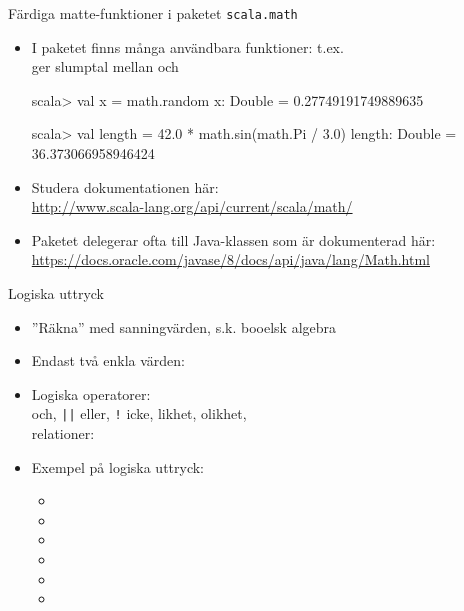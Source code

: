 \documentclass{simpleslides}
\begin{document}
    
    \begin{Slide}{Färdiga matte-funktioner i paketet \texttt{scala.math}}\SlideFontSmall
    \begin{itemize}
    \item I paketet \texttt{} finns många användbara funktioner: t.ex.\\
     ger slumptal mellan  och 
    \begin{REPLnonum}
    scala> val x = math.random
    x: Double = 0.27749191749889635
    
    scala> val length = 42.0 * math.sin(math.Pi / 3.0)
    length: Double = 36.373066958946424
    \end{REPLnonum}
    
    \item Studera dokumentationen här: \\{\SlideFontTiny
    \url{http://www.scala-lang.org/api/current/scala/math/}}
    
    \item Paketet  delegerar ofta till Java-klassen \texttt{} som är dokumenterad här: \\{\SlideFontTiny
    \url{https://docs.oracle.com/javase/8/docs/api/java/lang/Math.html}}
    
    \end{itemize}
    \end{Slide}
    
    
    
     
\begin{Slide}{Logiska uttryck}
\begin{itemize}
\item ''Räkna'' med sanningvärden,
s.k. booelsk algebra %

\item Endast två enkla värden: 
\item Logiska operatorer:\\
\code{&&} och, \texttt{||} eller, \texttt{!} icke, \code{==} likhet, \code{!=} olikhet, \\
relationer: \code{> < >= <=}

\item Exempel på logiska uttryck:
\begin{itemize}
\item[] 
\item[] 
\item[] 
\item[] 
\item[] 
\item[] 
\end{itemize}

\end{itemize}
\end{Slide}
    
\end{document}
